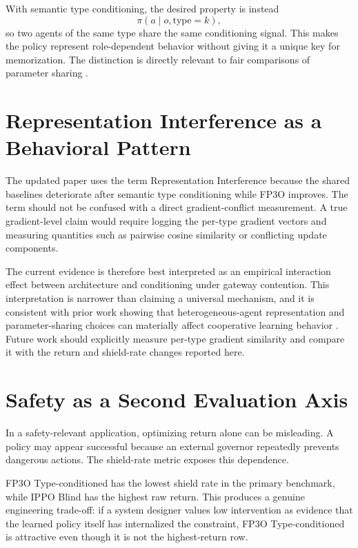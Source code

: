 \documentclass{iutbscthesis}
\begin{document}
With semantic type conditioning, the desired property is instead
\begin{equation}
\pi(a\mid o,\text{type}=k),
\end{equation}
so two agents of the same type share the same conditioning signal. This makes the policy represent role-dependent behavior without giving it a unique key for memorization. The distinction is directly relevant to fair comparisons of parameter sharing \parencite{terry2020revisiting}.

\section{Representation Interference as a Behavioral Pattern}
The updated paper uses the term Representation Interference because the shared baselines deteriorate after semantic type conditioning while FP3O improves. The term should not be confused with a direct gradient-conflict measurement. A true gradient-level claim would require logging the per-type gradient vectors and measuring quantities such as pairwise cosine similarity or conflicting update components.

The current evidence is therefore best interpreted as an empirical interaction effect between architecture and conditioning under gateway contention. This interpretation is narrower than claiming a universal mechanism, and it is consistent with prior work showing that heterogeneous-agent representation and parameter-sharing choices can materially affect cooperative learning behavior \parencite{terry2020revisiting,zhong2023harl,feng2023fp3o}. Future work should explicitly measure per-type gradient similarity and compare it with the return and shield-rate changes reported here.

\section{Safety as a Second Evaluation Axis}
In a safety-relevant application, optimizing return alone can be misleading. A policy may appear successful because an external governor repeatedly prevents dangerous actions. The shield-rate metric exposes this dependence.

FP3O Type-conditioned has the lowest shield rate in the primary benchmark, while IPPO Blind has the highest raw return. This produces a genuine engineering trade-off: if a system designer values low intervention as evidence that the learned policy itself has internalized the constraint, FP3O Type-conditioned is attractive even though it is not the highest-return row.
\end{document}
